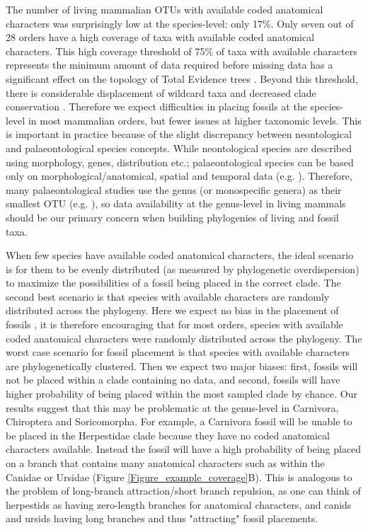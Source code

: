 \documentclass[12pt,letterpaper]{article}
\begin{document}
The number of living mammalian OTUs with available coded anatomical characters was surprisingly low at the species-level: only 17\%.
Only seven out of 28 orders have a high coverage of taxa with available coded anatomical characters.
This high coverage threshold of 75\% of taxa with available characters represents the minimum amount of data required before missing data has a significant effect on the topology of Total Evidence trees \cite{GuillermeCooper}.
Beyond this threshold, there is considerable displacement of wildcard taxa and decreased clade conservation \cite{GuillermeCooper}.
Therefore we expect difficulties in placing fossils at the species-level in most mammalian orders, but fewer issues at higher taxonomic levels.
This is important in practice because of the slight discrepancy between neontological and palaeontological species concepts.
While neontological species are described using morphology, genes, distribution etc.; palaeontological species can be based only on morphological/anatomical, spatial and temporal data (e.g. \cite{ni2013oldest}).
Therefore, many palaeontological studies use the genus (or monospecific genera) as their smallest OTU (e.g. \cite{ni2013oldest,O'Leary08022013}), so data availability at the genus-level in living mammals should be our primary concern when building phylogenies of living and fossil taxa.

When few species have available coded anatomical characters, the ideal scenario is for them to be evenly distributed (as measured by phylogenetic overdispersion) to maximize the possibilities of a fossil being placed in the correct clade.
The second best scenario is that species with available characters are randomly distributed across the phylogeny. 
Here we expect no bias in the placement of fossils \cite{GuillermeCooper}, it is therefore encouraging that for most orders, species with available coded anatomical characters were randomly distributed across the phylogeny.
The worst case scenario for fossil placement is that species with available characters are phylogenetically clustered. 
Then we expect two major biases: first, fossils will not be placed within a clade containing no data, and second, fossils will have higher probability of being placed within the most sampled clade by chance. 
Our results suggest that this may be problematic at the genus-level in Carnivora, Chiroptera and Soricomorpha. 
For example, a Carnivora fossil will be unable to be placed in the Herpestidae clade because they have no coded anatomical characters available.
Instead the fossil will have a high probability of being placed on a branch that contains many anatomical characters such as within the Canidae or Ursidae (Figure \ref{Figure_example_coverage}B). 
This is analogous to the problem of long-branch attraction/short branch repulsion, as one can think of herpestids as having zero-length branches for anatomical characters, and canids and ursids having long branches and thus "attracting" fossil placements.
\end{document}
